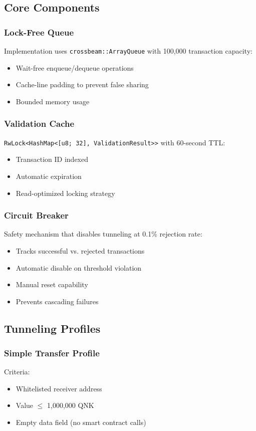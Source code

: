 \documentclass[11pt,a4paper]{article}
\begin{document}
\subsection{Core Components}

\subsubsection{Lock-Free Queue}
Implementation uses \texttt{crossbeam::ArrayQueue} with 100,000 transaction capacity:
\begin{itemize}
    \item Wait-free enqueue/dequeue operations
    \item Cache-line padding to prevent false sharing
    \item Bounded memory usage
\end{itemize}

\subsubsection{Validation Cache}
\texttt{RwLock<HashMap<[u8; 32], ValidationResult>>} with 60-second TTL:
\begin{itemize}
    \item Transaction ID indexed
    \item Automatic expiration
    \item Read-optimized locking strategy
\end{itemize}

\subsubsection{Circuit Breaker}
Safety mechanism that disables tunneling at 0.1\% rejection rate:
\begin{itemize}
    \item Tracks successful vs. rejected transactions
    \item Automatic disable on threshold violation
    \item Manual reset capability
    \item Prevents cascading failures
\end{itemize}

\subsection{Tunneling Profiles}

\subsubsection{Simple Transfer Profile}
Criteria:
\begin{itemize}
    \item Whitelisted receiver address
    \item Value $\leq$ 1,000,000 QNK
    \item Empty data field (no smart contract calls)
\end{itemize}
\end{document}
